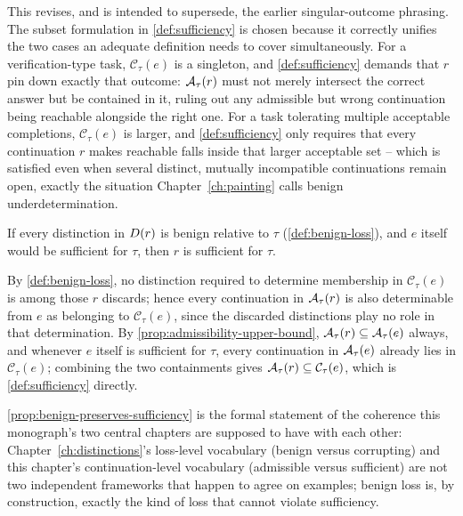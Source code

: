 This revises, and is intended to supersede, the earlier singular-outcome
phrasing. The subset formulation in \cref{def:sufficiency} is chosen
because it correctly unifies the two cases an adequate definition needs to
cover simultaneously. For a verification-type task, $\mathcal{C}_\tau(e)$
is a singleton, and \cref{def:sufficiency} demands that $r$ pin down
exactly that outcome: $\mathcal{A}_{\tau}(r)$ must not merely intersect the
correct answer but be contained in it, ruling out any admissible but wrong
continuation being reachable alongside the right one. For a task
tolerating multiple acceptable completions, $\mathcal{C}_\tau(e)$ is
larger, and \cref{def:sufficiency} only requires that every continuation
$r$ makes reachable falls inside that larger acceptable set -- which is
satisfied even when several distinct, mutually incompatible continuations
remain open, exactly the situation Chapter~\ref{ch:painting} calls benign
underdetermination.

\begin{proposition}
\label{prop:benign-preserves-sufficiency}
If every distinction in $D(r)$ is benign relative to $\tau$
(\cref{def:benign-loss}), and $e$ itself would be sufficient for $\tau$,
then $r$ is sufficient for $\tau$.
\end{proposition}

\begin{proofsketch}
By \cref{def:benign-loss}, no distinction required to determine membership
in $\mathcal{C}_\tau(e)$ is among those $r$ discards; hence every
continuation in $\mathcal{A}_{\tau}(r)$ is also determinable from $e$ as
belonging to $\mathcal{C}_\tau(e)$, since the discarded distinctions play
no role in that determination. By \cref{prop:admissibility-upper-bound},
$\mathcal{A}_{\tau}(r) \subseteq \mathcal{A}_{\tau}(e)$ always, and whenever $e$
itself is sufficient for $\tau$, every continuation in $\mathcal{A}_{\tau}(e)$
already lies in $\mathcal{C}_\tau(e)$; combining the two containments
gives $\mathcal{A}_{\tau}(r) \subseteq \mathcal{C}_\tau(e)$, which is
\cref{def:sufficiency} directly.
\end{proofsketch}

\cref{prop:benign-preserves-sufficiency} is the formal statement of the
coherence this monograph's two central chapters are supposed to have with
each other: Chapter~\ref{ch:distinctions}'s loss-level vocabulary
(benign versus corrupting) and this chapter's continuation-level
vocabulary (admissible versus sufficient) are not two independent
frameworks that happen to agree on examples; benign loss is, by
construction, exactly the kind of loss that cannot violate sufficiency.

